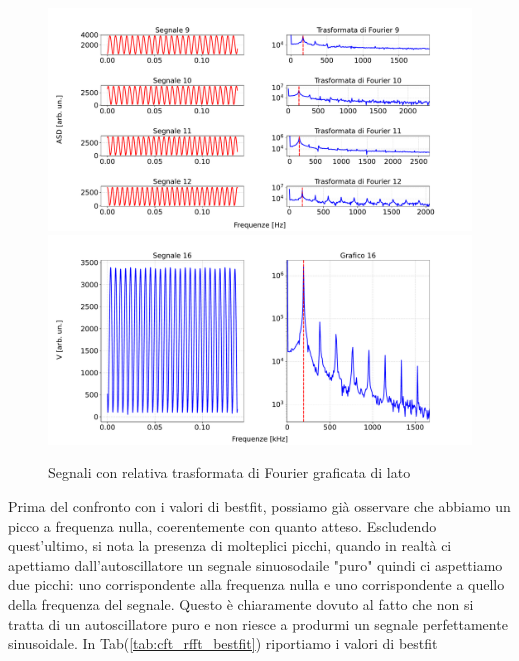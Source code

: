 \documentclass{article}
\begin{document}
        \begin{figure}[H]
            \centering
            \includegraphics[scale=0.40]{FFT11/third_graph.pdf}
            \includegraphics[scale=0.25]{FFT11/fourth_graph.pdf}
            \caption{Segnali con relativa trasformata di Fourier graficata di lato}
            \label{fig:sign_rfft_autoscill}
        \end{figure}

    Prima del confronto con i valori di bestfit, possiamo già osservare che abbiamo un picco a frequenza nulla, coerentemente con quanto atteso. Escludendo quest'ultimo, si nota la presenza di molteplici picchi, quando in realtà ci apettiamo dall'autoscillatore un segnale sinuosodaile "puro" quindi ci aspettiamo due picchi: uno corrispondente alla frequenza nulla e uno corrispondente a quello della frequenza del segnale. Questo è chiaramente dovuto al fatto che non si tratta di un autoscillatore puro e non riesce a produrmi un segnale perfettamente sinusoidale.
    In Tab(\ref{tab:cft_rfft_bestfit}) riportiamo i valori di bestfit
\end{document}
